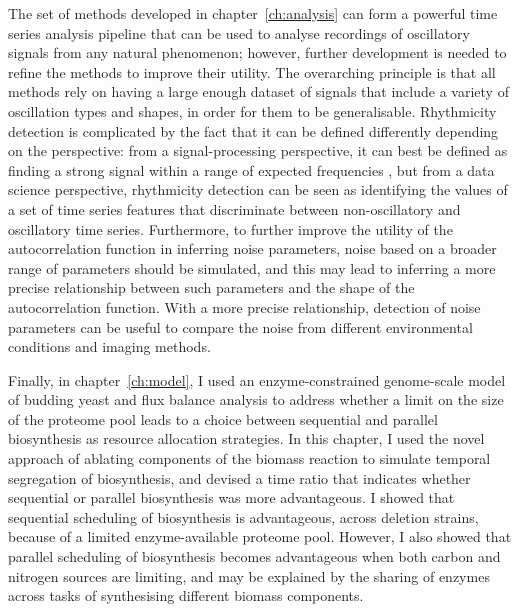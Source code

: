 The set of methods developed in chapter~\ref{ch:analysis} can form a powerful time series analysis pipeline that can be used to analyse recordings of oscillatory signals from any natural phenomenon; however, further development is needed to refine the methods to improve their utility.
The overarching principle is that all methods rely on having a large enough dataset of signals that include a variety of oscillation types and shapes, in order for them to be generalisable.
Rhythmicity detection is complicated by the fact that it can be defined differently depending on the perspective: from a signal-processing perspective, it can best be defined as finding a strong signal within a range of expected frequencies \parencite{zielinskiStrengthsLimitationsPeriod2014}, but from a data science perspective, rhythmicity detection can be seen as identifying the values of a set of time series features that discriminate between non-oscillatory and oscillatory time series.
Furthermore, to further improve the utility of the autocorrelation function in inferring noise parameters, noise based on a broader range of parameters should be simulated, and this may lead to inferring a more precise relationship between such parameters and the shape of the autocorrelation function.
With a more precise relationship, detection of noise parameters can be useful to compare the noise from different environmental conditions and imaging methods.

Finally, in chapter~\ref{ch:model}, I used an enzyme-constrained genome-scale model of budding yeast and flux balance analysis to address whether a limit on the size of the proteome pool leads to a choice between sequential and parallel biosynthesis as resource allocation strategies.
In this chapter, I used the novel approach of ablating components of the biomass reaction to simulate temporal segregation of biosynthesis, and devised a time ratio that indicates whether sequential or parallel biosynthesis was more advantageous.
I showed that sequential scheduling of biosynthesis is advantageous, across deletion strains, because of a limited enzyme-available proteome pool.
However, I also showed that parallel scheduling of biosynthesis becomes advantageous when both carbon and nitrogen sources are limiting, and may be explained by the sharing of enzymes across tasks of synthesising different biomass components.

